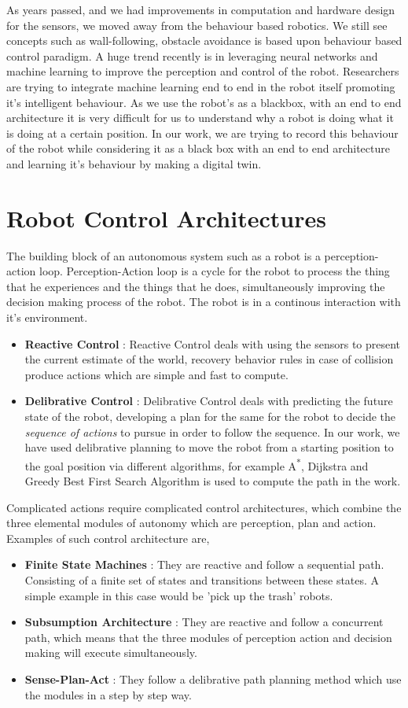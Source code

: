 As years passed, and we had improvements in computation and hardware design for the sensors, we moved away from the behaviour based robotics. We still see concepts such as wall-following, obstacle avoidance is based upon behaviour based control paradigm.
A huge trend recently is in leveraging neural networks and machine learning to improve the perception and control of the robot. Researchers are trying to integrate machine learning end to end in the robot itself promoting it's intelligent behaviour. As we use the robot's as a blackbox, with an end to end architecture it is very difficult for us to understand why a robot is doing what it is doing at a certain position.
In our work, we are trying to record this behaviour of the robot while considering it as a black box with an end to end architecture and learning it's behaviour by making a digital twin.
\section{Robot Control Architectures}
The building block of an autonomous system such as a robot is a perception-action loop. Perception-Action loop is a cycle for the robot to process the thing that he experiences and the things that he does, simultaneously improving the decision making process of the robot. The robot is in a continous interaction with it's environment. 
\begin{itemize}
    \item \textbf{Reactive Control} : Reactive Control deals with using the sensors to present the current estimate of the world, recovery behavior rules in case of collision produce actions which are simple and fast to compute.
    \item \textbf{Delibrative Control} : Delibrative Control deals with predicting the future state of the robot, developing a plan for the same for the robot to decide the \textit{sequence of actions} to pursue in order to follow the sequence. In our work, we have used delibrative planning to move the robot from a starting position to the goal position via different algorithms, for example A\textsuperscript{*}, Dijkstra and Greedy Best First Search Algorithm is used to compute the path in the work.
\end{itemize}
Complicated actions require complicated control architectures, which combine the three elemental modules of autonomy which are perception, plan and action. Examples of such control architecture are,
\begin{itemize}
    \item \textbf{Finite State Machines} : They are reactive and follow a sequential path. Consisting of a finite set of states and transitions between these states. A simple example in this case would be 'pick up the trash' robots.
    \item \textbf{Subsumption Architecture} : They are reactive and follow a concurrent path, which means that the three modules of perception action and decision making will execute simultaneously.
    \item \textbf{Sense-Plan-Act} : They follow a delibrative path planning method which use the modules in a step by step way.
\end{itemize}

